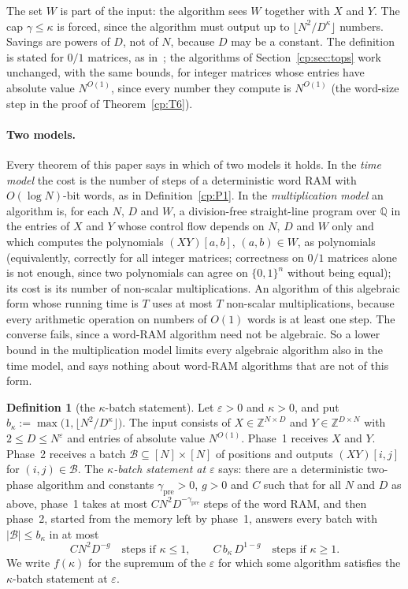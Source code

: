 \documentclass[11pt]{article}
\theoremstyle{definition}
\newtheorem{definition}[theorem]{Definition}
\theoremstyle{remark}
\providecommand{\eps}{\varepsilon}
\providecommand{\Z}{\mathbb{Z}}
\providecommand{\Q}{\mathbb{Q}}
\newcommand{\abs}[1]{\lvert #1\rvert}
\newcommand{\bk}{b_\kappa}                    %
\newcommand{\fbat}{f}                         %
\begin{document}
The set $W$ is part of the input: the algorithm sees $W$ together with $X$ and $Y$. The cap $\gamma\le\kappa$ is forced, since the algorithm must output up to $\lfloor N^2/D^\kappa\rfloor$ numbers. Savings are powers of $D$, not of $N$, because $D$ may be a constant. The definition is stated for $0/1$ matrices, as in~\cite{v2}; the algorithms of Section~\ref{cp:sec:tops} work unchanged, with the same bounds, for integer matrices whose entries have absolute value $N^{O(1)}$, since every number they compute is $N^{O(1)}$ (the word-size step in the proof of Theorem~\ref{cp:T6}).

\paragraph{Two models.}\label{cp:sec:models}
Every theorem of this paper says in which of two models it holds. In the \emph{time model} the cost is the number of steps of a deterministic word RAM with $O(\log N)$-bit words, as in Definition~\ref{cp:P1}. In the \emph{multiplication model} an algorithm is, for each $N$, $D$ and $W$, a division-free straight-line program over $\Q$ in the entries of $X$ and $Y$ whose control flow depends on $N$, $D$ and $W$ only and which computes the polynomials $(XY)[a,b]$, $(a,b)\in W$, as polynomials (equivalently, correctly for all integer matrices; correctness on $0/1$ matrices alone is not enough, since two polynomials can agree on $\{0,1\}^n$ without being equal); its cost is its number of non-scalar multiplications. An algorithm of this algebraic form whose running time is $T$ uses at most $T$ non-scalar multiplications, because every arithmetic operation on numbers of $O(1)$ words is at least one step. The converse fails, since a word-RAM algorithm need not be algebraic. So a lower bound in the multiplication model limits every algebraic algorithm also in the time model, and says nothing about word-RAM algorithms that are not of this form.

\begin{definition}[the $\kappa$-batch statement]\label{cp:P2}
Let $\eps>0$ and $\kappa>0$, and put $\bk:=\max\bigl(1,\lfloor N^2/D^\kappa\rfloor\bigr)$. The input consists of $X\in\Z^{N\times D}$ and $Y\in\Z^{D\times N}$ with $2\le D\le N^\eps$ and entries of absolute value $N^{O(1)}$. Phase~1 receives $X$ and $Y$. Phase~2 receives a batch $\mathcal B\subseteq[N]\times[N]$ of positions and outputs $(XY)[i,j]$ for $(i,j)\in\mathcal B$. The \emph{$\kappa$-batch statement at $\eps$} says: there are a deterministic two-phase algorithm and constants $\gamma_{\mathrm{pre}}>0$, $g>0$ and $C$ such that for all $N$ and $D$ as above, phase~1 takes at most $CN^2D^{-\gamma_{\mathrm{pre}}}$ steps of the word RAM, and then phase~2, started from the memory left by phase~1, answers every batch with $\abs{\mathcal B}\le\bk$ in at most
\[
CN^2D^{-g}\quad\text{steps if }\kappa\le1,\qquad C\,\bk\,D^{1-g}\quad\text{steps if }\kappa\ge1 .
\]
We write $\fbat(\kappa)$ for the supremum of the $\eps$ for which some algorithm satisfies the $\kappa$-batch statement at $\eps$.
\end{definition}
\end{document}
